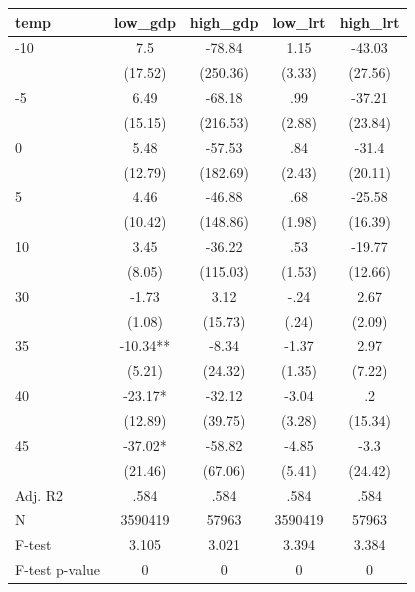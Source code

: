 \documentclass[]{article}
\begin{document}
\begin{tabular}{lcccc} \hline
temp & low\_gdp & high\_gdp & low\_lrt & high\_lrt \\ \hline
-10 & 7.5 & -78.84 & 1.15 & -43.03 \\
 & (17.52) & (250.36) & (3.33) & (27.56) \\
-5 & 6.49 & -68.18 & .99 & -37.21 \\
 & (15.15) & (216.53) & (2.88) & (23.84) \\
0 & 5.48 & -57.53 & .84 & -31.4 \\
 & (12.79) & (182.69) & (2.43) & (20.11) \\
5 & 4.46 & -46.88 & .68 & -25.58 \\
 & (10.42) & (148.86) & (1.98) & (16.39) \\
10 & 3.45 & -36.22 & .53 & -19.77 \\
 & (8.05) & (115.03) & (1.53) & (12.66) \\
30 & -1.73 & 3.12 & -.24 & 2.67 \\
 & (1.08) & (15.73) & (.24) & (2.09) \\
35 & -10.34** & -8.34 & -1.37 & 2.97 \\
 & (5.21) & (24.32) & (1.35) & (7.22) \\
40 & -23.17* & -32.12 & -3.04 & .2 \\
 & (12.89) & (39.75) & (3.28) & (15.34) \\
45 & -37.02* & -58.82 & -4.85 & -3.3 \\
 & (21.46) & (67.06) & (5.41) & (24.42) \\
\hline Adj. R2 & .584 & .584 & .584 & .584 \\
N & 3590419 & 57963 & 3590419 & 57963 \\
F-test & 3.105 & 3.021 & 3.394 & 3.384 \\
 F-test p-value & 0 & 0 & 0 & 0 \\ \hline
\end{tabular}
\end{document}
